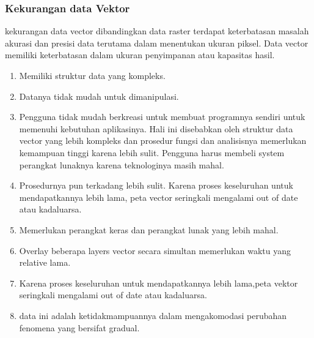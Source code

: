\begin{enumerate}
\subsubsection{Kekurangan data Vektor}
kekurangan data vector dibandingkan data raster
terdapat keterbatasan masalah akurasi dan presisi data terutama dalam menentukan ukuran piksel. Data vector memiliki keterbatasan dalam ukuran penyimpanan atau kapasitas hasil.
\begin{enumerate}
\item Memiliki struktur data yang kompleks.
\item Datanya tidak mudah untuk dimanipulasi.
\item Pengguna tidak mudah berkreasi untuk membuat programnya sendiri untuk memenuhi kebutuhan aplikasinya. Hali ini disebabkan oleh struktur data vector yang lebih kompleks dan prosedur fungsi dan analisisnya memerlukan kemampuan tinggi karena lebih sulit. Pengguna harus membeli system perangkat lunaknya karena teknologinya masih mahal.
\item Prosedurnya pun terkadang lebih sulit. Karena proses keseluruhan untuk mendapatkannya lebih lama, peta vector seringkali mengalami out of date atau kadaluarsa.
\item Memerlukan perangkat keras dan perangkat lunak yang lebih mahal.
\item Overlay beberapa layers vector secara simultan memerlukan waktu yang relative lama.
\item Karena proses keseluruhan untuk mendapatkannya lebih lama,peta vektor seringkali mengalami out of date atau kadaluarsa.
\item data ini adalah ketidakmampuannya dalam mengakomodasi perubahan fenomena yang bersifat gradual.
\end{enumerate}


\end{enumerate}
